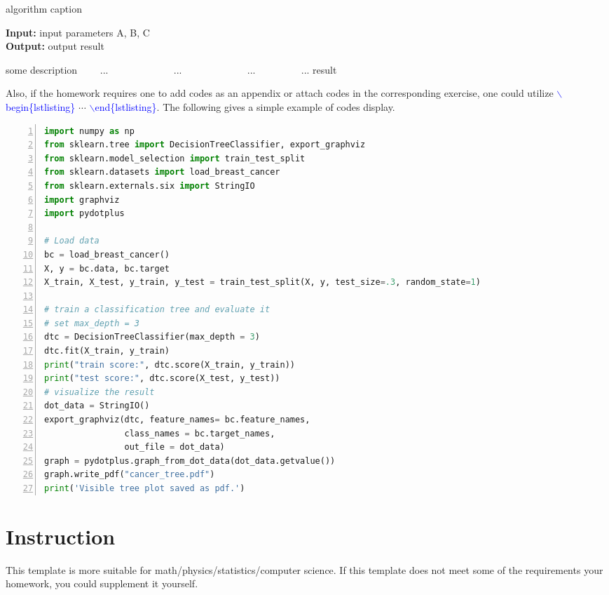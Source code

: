 \documentclass[12pt]{article}
\newcommand{\simarab}{\fontspec{Courier New}}
\begin{document}
\begin{algorithm}[H]
\caption{algorithm caption} %
\hspace*{0.02in} {\bf Input:} %
input parameters A, B, C\\
\hspace*{0.02in} {\bf Output:} %
output result
\begin{algorithmic}[1]
\State some description %
　　\State ...
　　　　\State ...
　　\Else
　　　　\State ...
　　\EndIf
\EndFor
{} %
　　\State ...
\EndWhile
\State \Return result
\end{algorithmic}
\end{algorithm}

Also, if the homework requires one to add codes as an appendix or attach codes in the corresponding exercise, one could utilize \textcolor{blue}{\simarab $\backslash$begin\{lstlisting\}} $\cdots$ \textcolor{blue}{\simarab $\backslash$end\{lstlisting\}}. The following gives a simple example of codes display.
\begin{lstlisting}[language=python, numbers=left]
import numpy as np
from sklearn.tree import DecisionTreeClassifier, export_graphviz
from sklearn.model_selection import train_test_split
from sklearn.datasets import load_breast_cancer
from sklearn.externals.six import StringIO
import graphviz
import pydotplus

# Load data
bc = load_breast_cancer()
X, y = bc.data, bc.target
X_train, X_test, y_train, y_test = train_test_split(X, y, test_size=.3, random_state=1)

# train a classification tree and evaluate it
# set max_depth = 3
dtc = DecisionTreeClassifier(max_depth = 3)
dtc.fit(X_train, y_train)
print("train score:", dtc.score(X_train, y_train))
print("test score:", dtc.score(X_test, y_test))
# visualize the result
dot_data = StringIO()
export_graphviz(dtc, feature_names= bc.feature_names, 
                class_names = bc.target_names,
                out_file = dot_data)
graph = pydotplus.graph_from_dot_data(dot_data.getvalue())
graph.write_pdf("cancer_tree.pdf")
print('Visible tree plot saved as pdf.')
\end{lstlisting}

\section{\bfseries Instruction}
This template is more suitable for math/physics/statistics/computer science. If this template does not meet some of the requirements your homework, you could supplement it yourself.
 
\end{document}
